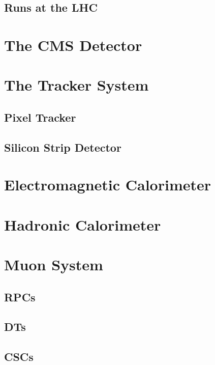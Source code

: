 \subsection{Runs at the LHC}
\label{sec:LHCRuns}

\section{The CMS Detector}
\label{sec:CMS}

\section{The Tracker System}
\label{sec:Tracker}

\subsection{Pixel Tracker}
\label{subsec:Pixel}

\subsection{Silicon Strip Detector}
\label{subsec:Strip}

\section{Electromagnetic Calorimeter}
\label{sec:ECal}

\section{Hadronic Calorimeter}
\label{sec:HCal}

\section{Muon System}
\label{sec:MuonSys}

\subsection{RPCs}
\label{subsec:RPCs}

\subsection{DTs}
\label{subsec:DTs}

\subsection{CSCs}
\label{subsec:CSCs}

